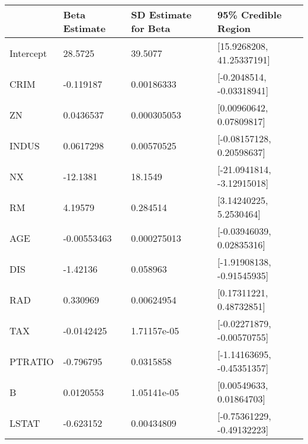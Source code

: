\begin{tabular}{llll}
\hline
           & Beta Estimate   & SD Estimate for Beta   & 95\% Credible Region        \\
\hline
 Intercept & 28.5725         & 39.5077                & [15.9268208, 41.25337191]  \\
 CRIM      & -0.119187       & 0.00186333             & [-0.2048514, -0.03318941]  \\
 ZN        & 0.0436537       & 0.000305053            & [0.00960642, 0.07809817]   \\
 INDUS     & 0.0617298       & 0.00570525             & [-0.08157128, 0.20598637]  \\
 NX        & -12.1381        & 18.1549                & [-21.0941814, -3.12915018] \\
 RM        & 4.19579         & 0.284514               & [3.14240225, 5.2530464]    \\
 AGE       & -0.00553463     & 0.000275013            & [-0.03946039, 0.02835316]  \\
 DIS       & -1.42136        & 0.058963               & [-1.91908138, -0.91545935] \\
 RAD       & 0.330969        & 0.00624954             & [0.17311221, 0.48732851]   \\
 TAX       & -0.0142425      & 1.71157e-05            & [-0.02271879, -0.00570755] \\
 PTRATIO   & -0.796795       & 0.0315858              & [-1.14163695, -0.45351357] \\
 B         & 0.0120553       & 1.05141e-05            & [0.00549633, 0.01864703]   \\
 LSTAT     & -0.623152       & 0.00434809             & [-0.75361229, -0.49132223] \\
\hline
\end{tabular}